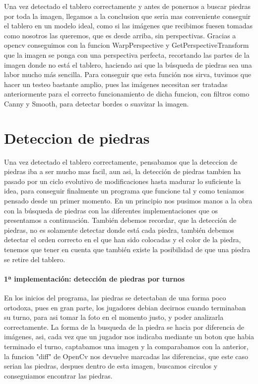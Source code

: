 \documentclass[12pt,a4paper]{report}
\begin{document}
Una vez detectado el tablero correctamente y antes de ponernos a buscar piedras
por toda la imagen, llegamos a la conclusion que seria mas conveniente conseguir
el tablero en un modelo ideal, como si las imágenes que recibimos fuesen tomadas
como nosotros las queremos, que es desde arriba, sin perspectivas.  Gracias a
opencv conseguimos con la funcion WarpPerspective y GetPerspectiveTransform que 
la imagen se ponga con una
perspectiva perfecta, recortando las partes de la imagen donde no está el
tablero, haciendo asi que la búsqueda de piedras sea una labor mucho más
sencilla. Para conseguir que esta función nos sirva, tuvimos que hacer un
testeo bastante amplio, pues las imágenes necesitan ser tratadas anteriormente
para el correcto funcionamiento de dicha funcion, con filtros como Canny y
Smooth, para detectar bordes o suavizar la imagen. 



\section{Deteccion de piedras} 

Una vez detectado el tablero correctamente,
pensabamos que la deteccion de piedras iba a ser mucho mas facil, aun asi, la
detección de piedras tambien ha pasado por un ciclo evolutivo de modificaciones
hasta madurar lo suficiente la idea, para conseguir finalmente un programa que
funcione tal y como teniamos pensado desde un primer momento. En un principio
nos pusimos manos a la obra con la búsqueda de piedras con las diferentes
implementaciones que os presentamos a continuación.
También debemos recordar, que la detección de
piedras, no es solamente detectar donde está cada piedra, también debemos
detectar el orden correcto en el que han sido colocadas y el color de la piedra,
tenemos que tener en cuenta que también existe la posibilidad de que una piedra
se retire del tablero. 

\paragraph{1ª implementación: detección de piedras por turnos}
En los inicios del programa, las piedras se detectaban de una forma poco
ortodoxa, pues en gran parte, los jugadores debian decirnos cuando terminaban su
turno, para asi tomar la foto en el momento justo, y poder analizarla
correctamente.  La forma de la busqueda de la piedra se hacia por diferencia de
imágenes, asi, cada vez que un jugador nos indicaba mediante un boton que habia
terminado el turno, captabamos una imagen y la comparabamos con la anterior, la
funcion "diff" de OpenCv nos devuelve marcadas las diferencias, que este caso
serian las piedras, despues dentro de esta imagen, buscamos circulos y
conseguiamos encontrar las piedras.  
\end{document}
